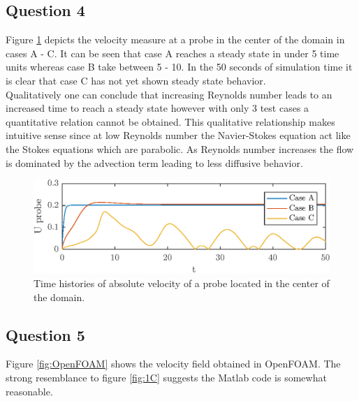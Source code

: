 \documentclass[10pt,a4paper]{article}
\begin{document}
\subsection{Question 4}

Figure \ref{fig:timeseries} depicts the velocity measure at a probe in the center of the domain in cases A - C. It can be seen that case A reaches a steady state in under 5 time units whereas case B take between 5 - 10. In the 50 seconds of simulation time it is clear that case C has not yet shown steady state behavior.\\

Qualitatively one can conclude that increasing Reynolds number leads to an increased time to reach a steady state however with only 3 test cases a quantitative relation cannot be obtained. This qualitative relationship makes intuitive sense since at low Reynolds number the Navier-Stokes equation act like the Stokes equations which are parabolic. As Reynolds number increases the flow is dominated by the advection term leading to less diffusive behavior.


\begin{figure}[H]
\centering
\includegraphics[]{Probe_history.eps}
\caption{Time histories of absolute velocity of a probe located in the center of the domain.}
\label{fig:timeseries}
\end{figure}





\subsection{Question 5}




Figure \ref{fig:OpenFOAM} shows the velocity field obtained in OpenFOAM. The strong resemblance to figure \ref{fig:1C} suggests the Matlab code is somewhat reasonable.
\end{document}
